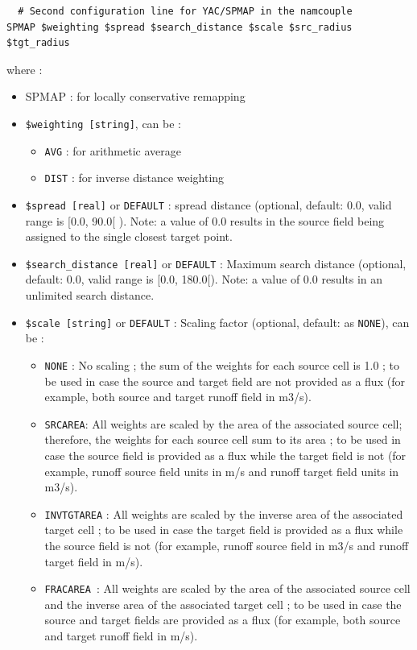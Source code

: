 \begin{itemize}
\begin{verbatim}
  # Second configuration line for YAC/SPMAP in the namcouple
SPMAP $weighting $spread $search_distance $scale $src_radius $tgt_radius
\end{verbatim}
where :
\begin{itemize}
\item SPMAP : for locally conservative remapping
\item {\tt \$weighting  [string]}, can be :
\begin{itemize}
  \item {\tt AVG} : for arithmetic average
  \item {\tt DIST} : for inverse distance weighting
\end{itemize}
\item {\tt \$spread [real]} or {\tt DEFAULT} : spread distance (optional, default: 0.0, valid range is [0.0, 90.0[ ). Note: a value of 0.0 results in the source field being assigned to the single closest target point.
\item {\tt \$search\_distance [real]} or {\tt DEFAULT} : Maximum search distance (optional, default: 0.0, valid range is [0.0, 180.0[).
Note: a value of 0.0 results in an unlimited search distance.
\item {\tt \$scale [string]} or {\tt DEFAULT} : Scaling factor (optional, default: as {\tt NONE}), can be :
\begin{itemize}
\item {\tt NONE} : No scaling ; the sum of the weights for each source cell is 1.0 ;
 to be used in case the source and target field are not provided as a flux
(for example, both source and target runoff field in m3/s).
\item {\tt SRCAREA}: All weights are scaled by the area of the associated source cell; therefore, the weights for each source cell sum to its area ; to be used in case the source field is provided as a flux while
the target field is not (for example, runoff source field units in m/s and
runoff target field units in m3/s).
\item {\tt INVTGTAREA} : All weights are scaled by the inverse area of the associated
target cell ; to be used in case the target field is provided as a flux
while the source field is not (for example, runoff source field in m3/s and runoff target field in m/s).
\item {\tt FRACAREA }: All weights are scaled by the area of the associated source cell and
the inverse area of the associated target cell ; to be used in case the source and target fields are provided as
a flux (for example, both source and target runoff field in m/s).
\end{itemize}


\end{itemize}
\end{itemize}
